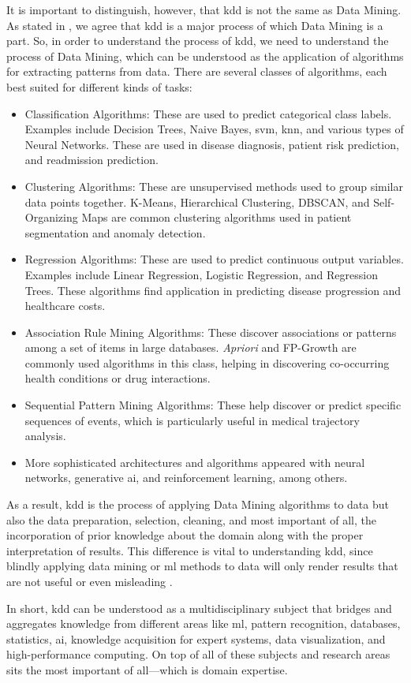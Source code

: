 It is important to distinguish, however, that \ac{kdd} is not the same as Data Mining. As stated in \cite{Fayyad_Piatetsky-Shapiro_Smyth_1996}, we agree that \ac{kdd} is a major process of which Data Mining is a part. So, in order to understand the process of \ac{kdd}, we need to understand the process of Data Mining, which can be understood as the application of algorithms for extracting patterns from data. There are several classes of algorithms, each best suited for different kinds of tasks:
\begin{itemize}
    \item Classification Algorithms: These are used to predict categorical class labels. Examples include Decision Trees, Naive Bayes, \ac{svm}, \ac{knn}, and various types of Neural Networks. These are used in disease diagnosis, patient risk prediction, and readmission prediction.
    \item Clustering Algorithms: These are unsupervised methods used to group similar data points together. K-Means, Hierarchical Clustering, DBSCAN, and Self-Organizing Maps are common clustering algorithms used in patient segmentation and anomaly detection.
    \item Regression Algorithms: These are used to predict continuous output variables. Examples include Linear Regression, Logistic Regression, and Regression Trees. These algorithms find application in predicting disease progression and healthcare costs.
    \item Association Rule Mining Algorithms: These discover associations or patterns among a set of items in large databases. \textit{Apriori} and FP-Growth are commonly used algorithms in this class, helping in discovering co-occurring health conditions or drug interactions.
    \item Sequential Pattern Mining Algorithms: These help discover or predict specific sequences of events, which is particularly useful in medical trajectory analysis.
    \item More sophisticated architectures and algorithms appeared with neural networks, generative \ac{ai}, and reinforcement learning, among others.
\end{itemize}

As a result, \ac{kdd} is the process of applying Data Mining algorithms to data but also the data preparation, selection, cleaning, and most important of all, the incorporation of prior knowledge about the domain along with the proper interpretation of results. This difference is vital to understanding \ac{kdd}, since blindly applying data mining or \ac{ml} methods to data will only render results that are not useful or even misleading \cite{Fayyad_Piatetsky-Shapiro_Smyth_1996}.

In short, \ac{kdd} can be understood as a multidisciplinary subject that bridges and aggregates knowledge from different areas like \ac{ml}, pattern recognition, databases, statistics, \ac{ai}, knowledge acquisition for expert systems, data visualization, and high-performance computing. On top of all of these subjects and research areas sits the most important of all—which is domain expertise.


